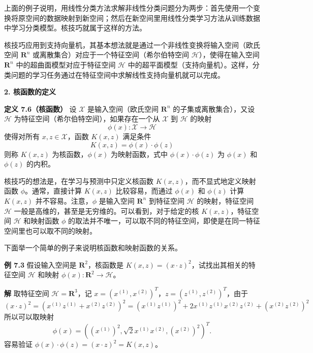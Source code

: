 \documentclass[UTF8, 12pt, fontset=fandol, oneside]{ctexart}
\begin{document}
上面的例子说明，用线性分类方法求解非线性分类问题分为两步：首先使用一个变换将原空间的数据映射到新空间；然后在新空间里用线性分类学习方法从训练数据中学习分类模型。核技巧就属于这样的方法。

核技巧应用到支持向量机，其基本想法就是通过一个非线性变换将输入空间（欧氏空间 $\mathbf{R}^n$ 或离散集合）对应于一个特征空间（希尔伯特空间 $\mathcal{H}$），使得在输入空间 $\mathbf{R}^n$ 中的超曲面模型对应于特征空间 $\mathcal{H}$ 中的超平面模型（支持向量机）。这样，分类问题的学习任务通过在特征空间中求解线性支持向量机就可以完成。

\noindent\textbf{2. 核函数的定义}\quad

\noindent\textbf{定义 7.6（核函数）}\quad
设 $\mathcal{X}$ 是输入空间（欧氏空间 $\mathbf{R}^n$ 的子集或离散集合），又设 $\mathcal{H}$ 为特征空间（希尔伯特空间），如果存在一个从 $\mathcal{X}$ 到 $\mathcal{H}$ 的映射
\begin{equation}
\phi(x):\mathcal{X}\to\mathcal{H}
\tag{7.65}
\end{equation}
使得对所有 $x,z\in\mathcal{X}$，函数 $K(x,z)$ 满足条件
\begin{equation}
K(x,z)=\phi(x)\cdot\phi(z)
\tag{7.66}
\end{equation}
则称 $K(x,z)$ 为核函数，$\phi(x)$ 为映射函数，式中 $\phi(x)\cdot\phi(z)$ 为 $\phi(x)$ 和 $\phi(z)$ 的内积。

核技巧的想法是，在学习与预测中只定义核函数 $K(x,z)$，而不显式地定义映射函数 $\phi$。通常，直接计算 $K(x,z)$ 比较容易，而通过 $\phi(x)$ 和 $\phi(z)$ 计算 $K(x,z)$ 并不容易。注意，$\phi$ 是输入空间 $\mathbf{R}^n$ 到特征空间 $\mathcal{H}$ 的映射，特征空间 $\mathcal{H}$ 一般是高维的，甚至是无穷维的。可以看到，对于给定的核 $K(x,z)$，特征空间 $\mathcal{H}$ 和映射函数 $\phi$ 的取法并不唯一，可以取不同的特征空间，即使是在同一特征空间里也可以取不同的映射。

下面举一个简单的例子来说明核函数和映射函数的关系。

\noindent\textbf{例 7.3}\quad
假设输入空间是 $\mathbf{R}^2$，核函数是 $K(x,z)=(x\cdot z)^2$，试找出其相关的特征空间 $\mathcal{H}$ 和映射 $\phi(x):\mathbf{R}^2\to\mathcal{H}$。

\noindent\textbf{解}\quad
取特征空间 $\mathcal{H}=\mathbf{R}^3$，记 $x=(x^{(1)},x^{(2)})^T$，$z=(z^{(1)},z^{(2)})^T$，由于
\[
(x\cdot z)^2=(x^{(1)}z^{(1)}+x^{(2)}z^{(2)})^2=(x^{(1)}z^{(1)})^2+2x^{(1)}z^{(1)}x^{(2)}z^{(2)}+(x^{(2)}z^{(2)})^2
\]
所以可以取映射
\[
\phi(x)=((x^{(1)})^2,\sqrt{2}x^{(1)}x^{(2)},(x^{(2)})^2)^T.
\]
容易验证 $\phi(x)\cdot\phi(z)=(x\cdot z)^2=K(x,z)$。
\end{document}
